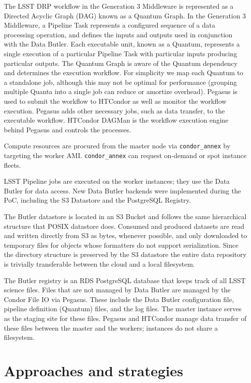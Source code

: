 The LSST DRP workflow in the Generation 3 Middleware is represented as a Directed Acyclic Graph (DAG) known as a Quantum Graph.
In the Generation 3 Middleware, a Pipeline Task represents a configured sequence of a data processing operation, and defines the inputs and outputs used in conjunction with the Data Butler.
Each executable unit, known as a Quantum, represents a single execution of a particular Pipeline Task with particular inputs producing particular outputs.
The Quantum Graph is aware of the Quantum dependency and determines the execution workflow.
For simplicity we map each Quantum to a standalone job, although this may not be optimal for performance (grouping multiple Quanta into a single job can reduce or amortize overhead).
Pegasus is used to submit the workflow to HTCondor as well as monitor the workflow execution.
Pegasus adds other necessary jobs, such as data transfer, to the executable workflow.
HTCondor DAGMan is the workflow execution engine behind Pegasus and controls the processes.

Compute resources are procured from the master node via \texttt{condor\_annex} by targeting the worker AMI.
\texttt{condor\_annex} can request on-demand or spot instance fleets.

LSST Pipeline jobs are executed on the worker instances; they use the Data Butler for data access.
New Data Butler backends were implemented during the PoC, including the S3 Datastore and the PostgreSQL Registry.

The Butler datastore is located in an S3 Bucket and follows the same hierarchical structure that POSIX datastore does.
Consumed and produced datasets are read and written directly from S3 as bytes, whenever possible, and only downloaded to temporary files for objects whose formatters do not support serialization.
Since the directory structure is preserved by the S3 datastore the entire data repository is trivially transferable between the cloud and a local filesystem.

The Butler registry is an RDS PostgreSQL database that keeps track of all LSST science files.
Files that are not managed by Data Butler are managed by the Condor File IO via Pegasus.
These include the Data Butler configuration file, pipeline definition (Quantum) files, and the log files.
The master instance serves as the staging site for these files.
Pegasus and HTCondor manage data transfer of these files between the master and the workers; instances do not share a filesystem.


\section{Approaches and strategies} \label{sec:approach}

